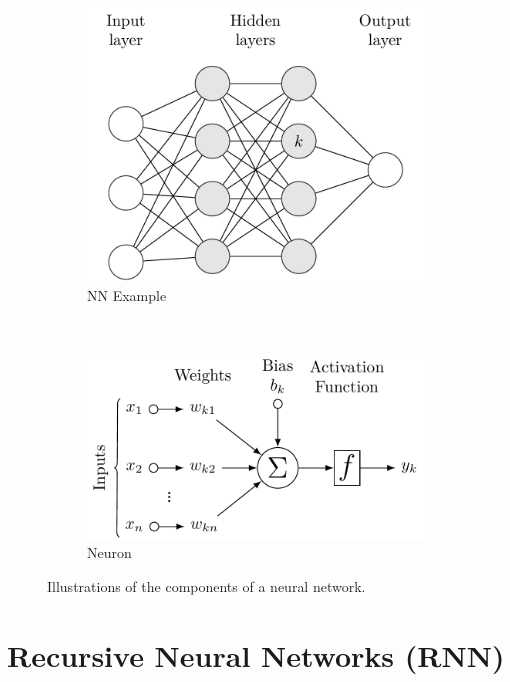 \begin{figure}[H]
  \centering
  \begin{subfigure}[b]{0.48\textwidth}\centering
      \includegraphics[width=\textwidth]{figures/ml/NN_diagram/NN_diagram}
  \caption{NN Example}
  \label{fig:NN:ex}
  \end{subfigure}
  ~
  \begin{subfigure}[b]{0.48\textwidth}\centering
      \includegraphics[width=\textwidth]{figures/ml/NN_neuron/NN_neuron}
  \caption{Neuron}
  \label{fig:NN:Neuron}
  \end{subfigure}
\caption{
Illustrations of the components of a neural network.
\label{fig:NN}
}
\end{figure}

\section{Recursive Neural Networks (RNN)}
\label{class:RNN}

